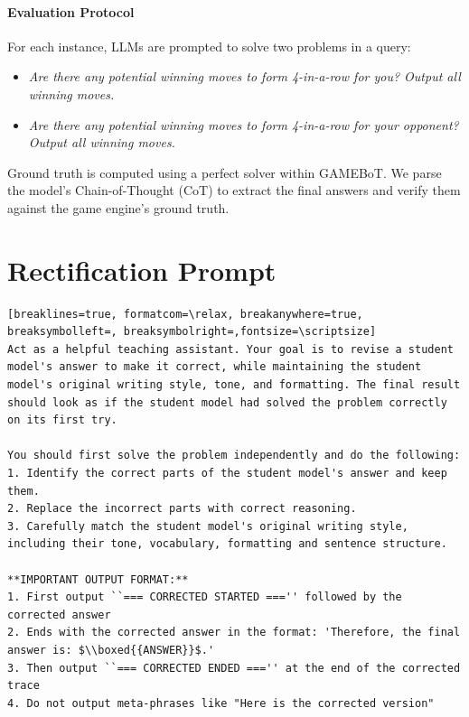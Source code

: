 \documentclass{article}
\theoremstyle{plain}
\theoremstyle{definition}
\theoremstyle{remark}
\begin{document}
\paragraph{Evaluation Protocol}
For each instance, LLMs are prompted to solve two problems in a query:
\begin{itemize}
    \item \textit{Are there any potential winning moves to form 4-in-a-row for you? Output all winning moves.}
    \item \textit{Are there any potential winning moves to form 4-in-a-row for your opponent? Output all winning moves.}
\end{itemize}
Ground truth is computed using a perfect solver within GAMEBoT. We parse the model's Chain-of-Thought (CoT) to extract the final answers and verify them against the game engine's ground truth.




\section{Rectification Prompt}
\label{appd:prompt}
\begin{tcolorbox}[colback=green!3, title=Rectification Prompt Without Ground Truth, enhanced, sharp corners, fonttitle=\small]
\begin{Verbatim}[breaklines=true, formatcom=\relax, breakanywhere=true, breaksymbolleft=, breaksymbolright=,fontsize=\scriptsize]
Act as a helpful teaching assistant. Your goal is to revise a student model's answer to make it correct, while maintaining the student model's original writing style, tone, and formatting. The final result should look as if the student model had solved the problem correctly on its first try.

You should first solve the problem independently and do the following:
1. Identify the correct parts of the student model's answer and keep them.
2. Replace the incorrect parts with correct reasoning.
3. Carefully match the student model's original writing style, including their tone, vocabulary, formatting and sentence structure.

**IMPORTANT OUTPUT FORMAT:**
1. First output ``=== CORRECTED STARTED ==='' followed by the corrected answer
2. Ends with the corrected answer in the format: 'Therefore, the final answer is: $\\boxed{{ANSWER}}$.'
3. Then output ``=== CORRECTED ENDED ==='' at the end of the corrected trace
4. Do not output meta-phrases like "Here is the corrected version"
\end{Verbatim}
\end{tcolorbox}
\end{document}
